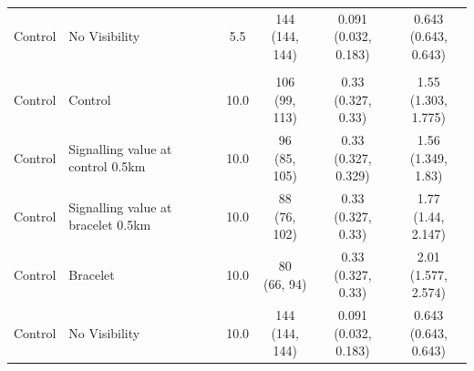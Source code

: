 \begin{tabular}{llcccc}
\hspace{1em}Control & No Visibility & 5.5 & \makecell[c]{144\\(144, 144)} & \makecell[c]{0.091\\(0.032, 0.183)} & \makecell[c]{0.643\\(0.643, 0.643)}\\
\addlinespace[0.3em]
\hline
\multicolumn{6}{l}{\textit{\textbf{Panel F: Policymaker allocation, 10km}}}\\
\hline
\hspace{1em}Control & Control & 10.0 & \makecell[c]{106\\(99, 113)} & \makecell[c]{0.33\\(0.327, 0.33)} & \makecell[c]{1.55\\(1.303, 1.775)}\\
\hspace{1em}Control & Signalling value at control 0.5km & 10.0 & \makecell[c]{96\\(85, 105)} & \makecell[c]{0.33\\(0.327, 0.329)} & \makecell[c]{1.56\\(1.349, 1.83)}\\
\hspace{1em}Control & Signalling value at bracelet 0.5km & 10.0 & \makecell[c]{88\\(76, 102)} & \makecell[c]{0.33\\(0.327, 0.33)} & \makecell[c]{1.77\\(1.44, 2.147)}\\
\hspace{1em}Control & Bracelet & 10.0 & \makecell[c]{80\\(66, 94)} & \makecell[c]{0.33\\(0.327, 0.33)} & \makecell[c]{2.01\\(1.577, 2.574)}\\
\hspace{1em}Control & No Visibility & 10.0 & \makecell[c]{144\\(144, 144)} & \makecell[c]{0.091\\(0.032, 0.183)} & \makecell[c]{0.643\\(0.643, 0.643)}\\
\bottomrule
\end{tabular}

